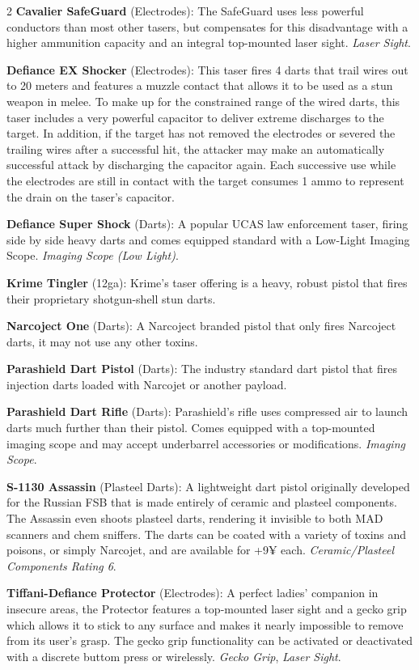\documentclass[
  oneside]{article}
\begin{document}
\begin{multicols}{2}
\textbf{Cavalier SafeGuard} (Electrodes): The
SafeGuard uses less powerful conductors than most
other tasers, but compensates for this
disadvantage with a higher ammunition capacity and
an integral top-mounted laser sight. \emph{Laser
Sight}.

\textbf{Defiance EX Shocker} (Electrodes): This
taser fires 4 darts that trail wires out to 20
meters and features a muzzle contact that allows
it to be used as a stun weapon in melee. To make
up for the constrained range of the wired darts,
this taser includes a very powerful capacitor to
deliver extreme discharges to the target. In
addition, if the target has not removed the
electrodes or severed the trailing wires after a
successful hit, the attacker may make an
automatically successful attack by discharging the
capacitor again. Each successive use while the
electrodes are still in contact with the target
consumes 1 ammo to represent the drain on the
taser's capacitor.

\textbf{Defiance Super Shock} (Darts): A popular
UCAS law enforcement taser, firing side by side
heavy darts and comes equipped standard with a
Low-Light Imaging Scope. \emph{Imaging Scope (Low
Light)}.

\textbf{Krime Tingler} (12ga): Krime's taser
offering is a heavy, robust pistol that fires
their proprietary shotgun-shell stun darts.

\textbf{Narcoject One} (Darts): A Narcoject
branded pistol that only fires Narcoject darts, it
may not use any other toxins.

\textbf{Parashield Dart Pistol} (Darts): The
industry standard dart pistol that fires injection
darts loaded with Narcojet or another payload.

\textbf{Parashield Dart Rifle} (Darts):
Parashield's rifle uses compressed air to launch
darts much further than their pistol. Comes
equipped with a top-mounted imaging scope and may
accept underbarrel accessories or modifications.
\emph{Imaging Scope}.

\textbf{S-1130 Assassin} (Plasteel Darts): A
lightweight dart pistol originally developed for
the Russian FSB that is made entirely of ceramic
and plasteel components. The Assassin even shoots
plasteel darts, rendering it invisible to both MAD
scanners and chem sniffers. The darts can be
coated with a variety of toxins and poisons, or
simply Narcojet, and are available for +9¥ each.
\emph{Ceramic/Plasteel Components Rating 6}.

\textbf{Tiffani-Defiance Protector} (Electrodes):
A perfect ladies' companion in insecure areas, the
Protector features a top-mounted laser sight and a
gecko grip which allows it to stick to any surface
and makes it nearly impossible to remove from its
user's grasp. The gecko grip functionality can be
activated or deactivated with a discrete buttom
press or wirelessly. \emph{Gecko Grip},
\emph{Laser Sight}.


\end{multicols}
\end{document}
